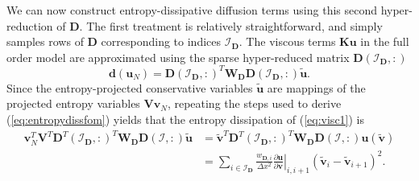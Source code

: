 \documentclass[review]{siamart171218}
\theoremstyle{assumption}
\renewcommand{\tilde}{\widetilde}
\newcommand{\pd}[2]{\frac{\partial#1}{\partial#2}}
\newcommand{\LRp}[1]{\left( #1 \right)}
\newcommand{\LRl}[1]{\left. #1 \right|}
\begin{document}
We can now construct entropy-dissipative diffusion terms using this second hyper-reduction of $\bm{D}$.  The first treatment is relatively straightforward, and simply samples rows of $\bm{D}$ corresponding to indices $\mathcal{I}_{\bm{D}}$.  The viscous terms $\bm{K}\bm{u}$ in the full order model are approximated using the sparse hyper-reduced matrix $\bm{D}\LRp{\mathcal{I}_{\bm{D}},:}$
\begin{equation}
\bm{d}(\bm{u}_N) = \bm{D}\LRp{\mathcal{I}_{\bm{D}},:}^T \bm{W}_{\bm{D}} \bm{D}\LRp{\mathcal{I}_{\bm{D}},:}\tilde{\bm{u}}.
\label{eq:visc1}
\end{equation}
Since the entropy-projected conservative variables $\tilde{\bm{u}}$ are mappings of the projected entropy variables $\bm{V}\bm{v}_N$, repeating the steps used to derive (\ref{eq:entropydissfom}) yields that the entropy dissipation of (\ref{eq:visc1}) is 
\begin{align*}
\bm{v}_N^T\bm{V}^T\bm{D}^T\LRp{\mathcal{I}_{\bm{D}},:}^T \bm{W}_{\bm{D}} \bm{D}\LRp{\mathcal{I},:}\tilde{\bm{u}} &= 
\tilde{\bm{v}}^T\bm{D}^T\LRp{\mathcal{I}_{\bm{D}},:}^T \bm{W}_{\bm{D}} \bm{D}\LRp{\mathcal{I},:}\bm{u}\LRp{\tilde{\bm{v}}}
\\
&= \sum_{i\in \mathcal{I}_{\bm{D}}} \frac{w_{\bm{D},i}}{\Delta x^2} \LRl{\pd{\bm{u}}{\bm{v}}}_{i,i+1} \LRp{\tilde{\bm{v}}_i - \tilde{\bm{v}}_{i+1}}^2.
\end{align*}
\end{document}
